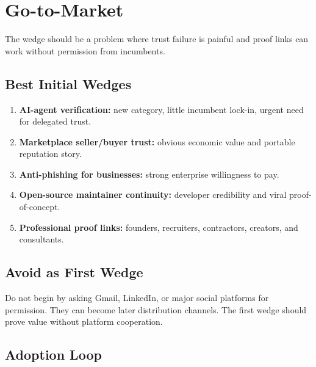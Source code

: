 \documentclass[11pt]{article}
\begin{document}
\section{Go-to-Market}

The wedge should be a problem where trust failure is painful and proof links can work without permission from incumbents.

\subsection{Best Initial Wedges}

\begin{enumerate}
    \item \textbf{AI-agent verification:} new category, little incumbent lock-in, urgent need for delegated trust.
    \item \textbf{Marketplace seller/buyer trust:} obvious economic value and portable reputation story.
    \item \textbf{Anti-phishing for businesses:} strong enterprise willingness to pay.
    \item \textbf{Open-source maintainer continuity:} developer credibility and viral proof-of-concept.
    \item \textbf{Professional proof links:} founders, recruiters, contractors, creators, and consultants.
\end{enumerate}

\subsection{Avoid as First Wedge}

Do not begin by asking Gmail, LinkedIn, or major social platforms for permission. They can become later distribution channels. The first wedge should prove value without platform cooperation.

\subsection{Adoption Loop}
\end{document}

